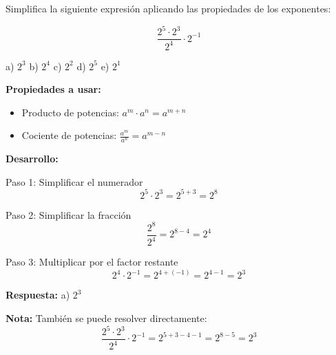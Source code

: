 \begin{ejercicio}[
  id=MATU_ALG_001,                    %
  materia_principal=matematicas_preuniversitaria,  %
  codigo_materia=MATU,                %
  capitulo=algebra,                   %
  subtema=exponentes,                 %
  nivel=basico,                       %
  procedencia="Examen UNI 2023",      %
  visibilidad=web_impreso,            %
  tiempo_estimado=5,                  %
  libros={matematicas_pre, algebra_completa},  %
  dificultad=2,                       %
  tags={exponentes, propiedades}      %
]

% 

Simplifica la siguiente expresión aplicando las propiedades de los exponentes:

$$\frac{2^5 \cdot 2^3}{2^4} \cdot 2^{-1}$$

a) $2^3$  \quad b) $2^4$  \quad c) $2^2$  \quad d) $2^5$  \quad e) $2^1$

\begin{solucion}
% 

\textbf{Propiedades a usar:}
\begin{itemize}
    \item Producto de potencias: $a^m \cdot a^n = a^{m+n}$
    \item Cociente de potencias: $\frac{a^m}{a^n} = a^{m-n}$
\end{itemize}

\textbf{Desarrollo:}

Paso 1: Simplificar el numerador
$$2^5 \cdot 2^3 = 2^{5+3} = 2^8$$

Paso 2: Simplificar la fracción
$$\frac{2^8}{2^4} = 2^{8-4} = 2^4$$

Paso 3: Multiplicar por el factor restante
$$2^4 \cdot 2^{-1} = 2^{4+(-1)} = 2^{4-1} = 2^3$$

\textbf{Respuesta:} a) $2^3$

\textbf{Nota:} También se puede resolver directamente:
$$\frac{2^5 \cdot 2^3}{2^4} \cdot 2^{-1} = 2^{5+3-4-1} = 2^{8-5} = 2^3$$
\end{solucion}
\end{ejercicio}

